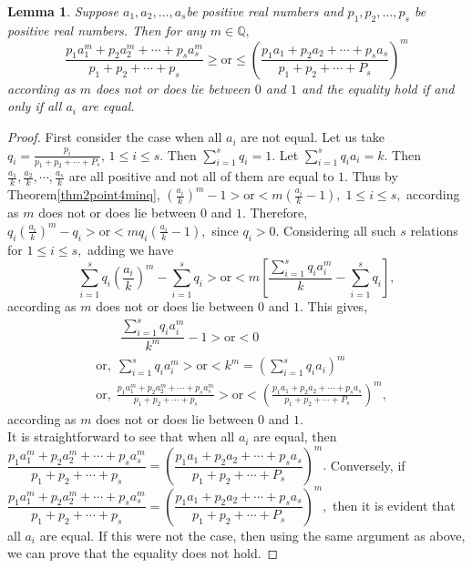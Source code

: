 \documentclass[final,1p,times]{elsarticle}
\newtheorem{lem}[thm]{Lemma}
\begin{document}
	\begin{lem}\label{lemmma2point4}
		Suppose $a_1,a_2,\ldots,a_s$be positive real numbers and  $p_1,p_2,\ldots,p_s$ be positive real numbers. Then for any $m \in \mathbb{Q},$
		$$ \frac{p_1 a_{1}^m + p_2 a_{2}^m+ \cdots + p_s a_{s}^m}{p_1+p_2+ \cdots + p_s}\geq \text{or} \leq \left(\frac{p_1 a_1 + p_2 a_2 + \cdots +p_s a_s}{p_1 + p_2 + \cdots + P_s} \right)^m$$
		according as $m$ does not or does lie between $0$ and $1$ and the equality hold if and only if all $a_i$ are equal.
	\end{lem}
\begin{proof}
	First consider the case when all $a_i$ are not equal. Let us take $q_i = \frac{p_i}{p_1 + p_2 + \cdots + P_s},\,1 \leq i \leq s.$ Then $\sum\limits_{i=1}^s q_i = 1.$ Let $\sum\limits_{i=1}^s q_i a_i = k.$ Then $\frac{a_1}{k}, \frac{a_2}{k},\cdots, \frac{a_s}{k}$ are all positive and  not all of them are equal to $1.$ Thus by Theorem\ref{thm2point4minq},  $\left(\frac{a_i}{k}\right)^m -1 > \text{or} < m \left(\frac{a_i}{k} - 1\right),\;1\leq i \leq s,$ according as $m$ does not or does lie between $0$ and $1.$ Therefore, $q_i\left(\frac{a_i}{k}\right)^m - q_i > \text{or} < mq_i \left(\frac{a_i}{k} - 1\right),$ since $q_i > 0.$ Considering all such $s$ relations for $1 \leq i \leq s,$ adding we have
	$$\sum\limits_{i=1}^s q_i\left(\frac{a_i}{k}\right)^m - \sum\limits_{i=1}^s q_i > \text{or} < m\left[ \dfrac{\sum\limits_{i=1}^s q_i a_{i}^m}{k} - \sum\limits_{i=1}^s q_i \right],$$
	according as $m$ does not or does lie between $0$ and $1.$ This gives, 
	\begin{align*}
		&\;\;\;\;\;\;\;\dfrac{\sum\limits_{i=1}^s q_i a_{i}^m}{k^m} -1 > \text{or} < 0 \\& \text{or},\; \sum\limits_{i=1}^s q_i a_{i}^m >\text{or} < k^m = \left(  \sum\limits_{i=1}^s q_i a_i\right)^m \\& \text{or},\;\frac{p_1 a_{1}^m + p_2 a_{2}^m+ \cdots + p_s a_{s}^m}{p_1+p_2+ \cdots + p_s} > \text{or} < \left(\frac{p_1 a_1 + p_2 a_2 + \cdots +p_s a_s}{p_1 + p_2 + \cdots + P_s} \right)^m,
	\end{align*}
according as $m$ does not or does lie between $0$ and $1.$\\
It is straightforward to see that when all $a_i$ are equal, then $\dfrac{p_1 a_{1}^m + p_2 a_{2}^m+ \cdots + p_s a_{s}^m}{p_1+p_2+ \cdots + p_s} = \left(\dfrac{p_1 a_1 + p_2 a_2 + \cdots +p_s a_s}{p_1 + p_2 + \cdots + P_s} \right)^m.$ Conversely, if $\dfrac{p_1 a_{1}^m + p_2 a_{2}^m+ \cdots + p_s a_{s}^m}{p_1+p_2+ \cdots + p_s} = \left(\dfrac{p_1 a_1 + p_2 a_2 + \cdots +p_s a_s}{p_1 + p_2 + \cdots + P_s} \right)^m,$ then it is evident that all $a_i$ are equal. If this were not the case, then using the same argument as above, we can prove that the equality does not hold.
\end{proof}
	
\end{document}
